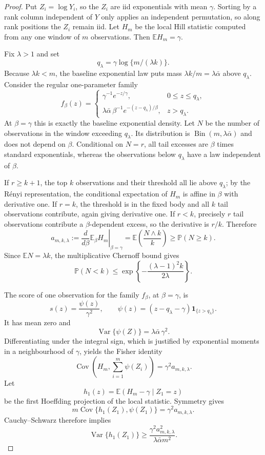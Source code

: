 \begin{proof}
Put $Z_i=\log Y_i$, so the $Z_i$ are iid exponentials with mean $\gamma$.
Sorting by a rank column independent of $Y$ only applies an independent
permutation, so along rank positions the $Z_i$ remain iid. Let $H_m$ be
the local Hill statistic computed from any one window of $m$ observations.
Then $\mathbb EH_m=\gamma$.

Fix $\lambda>1$ and set
\[
 q_\lambda=\gamma\log\{m/(\lambda k)\}.
\]
Because $\lambda k<m$, the baseline exponential law puts mass
$\lambda k/m=\lambda\bar\alpha$ above $q_\lambda$. Consider the regular
one-parameter family
\[
 f_\beta(z)=
 \begin{cases}
  \gamma^{-1}e^{-z/\gamma},&0\le z\le q_\lambda,\\[2mm]
  \lambda\bar\alpha\,\beta^{-1}
  e^{-(z-q_\lambda)/\beta},&z>q_\lambda.
 \end{cases}
\]
At $\beta=\gamma$ this is exactly the baseline exponential density.
Let $N$ be the number of observations in the window exceeding
$q_\lambda$. Its distribution is
$\operatorname{Bin}(m,\lambda\bar\alpha)$ and does not depend on $\beta$.
Conditional on $N=r$, all tail excesses are $\beta$ times standard
exponentials, whereas the observations below $q_\lambda$ have a law
independent of $\beta$.

If $r\ge k+1$, the top $k$ observations and their threshold all lie above
$q_\lambda$; by the R\'enyi representation, the conditional expectation of
$H_m$ is affine in $\beta$ with derivative one. If $r=k$, the threshold is
in the fixed body and all $k$ tail observations contribute, again giving
derivative one. If $r<k$, precisely $r$ tail observations contribute a
$\beta$-dependent excess, so the derivative is $r/k$. Therefore
\[
 a_{m,k,\lambda}
 :=\left.\frac{d}{d\beta}\mathbb E_\beta H_m\right|_{\beta=\gamma}
 =\mathbb E\left(\frac{N\wedge k}{k}\right)
 \ge\mathbb P(N\ge k).
\]
Since $\mathbb EN=\lambda k$, the multiplicative Chernoff bound gives
\[
 \mathbb P(N<k)
 \le\exp\left\{-\frac{(\lambda-1)^2k}{2\lambda}\right\}.
\]

The score of one observation for the family $f_\beta$, at
$\beta=\gamma$, is
\[
 s(z)=\frac{\psi(z)}{\gamma^2},
 \qquad
 \psi(z)=(z-q_\lambda-\gamma)\mathbf 1_{\{z>q_\lambda\}}.
\]
It has mean zero and
\[
 \operatorname{Var}\{\psi(Z)\}
 =\lambda\bar\alpha\,\gamma^2.
\]
Differentiating under the integral sign, which is justified by exponential
moments in a neighbourhood of $\gamma$, yields the Fisher identity
\[
 \operatorname{Cov}\left(H_m,\sum_{i=1}^m\psi(Z_i)\right)
 =\gamma^2a_{m,k,\lambda}.
\]
Let
\[
 h_1(z)=\mathbb E(H_m-\gamma\mid Z_1=z)
\]
be the first Hoeffding projection of the local statistic. Symmetry gives
\[
 m\operatorname{Cov}\{h_1(Z_1),\psi(Z_1)\}
 =\gamma^2a_{m,k,\lambda}.
\]
Cauchy--Schwarz therefore implies
\[
 \operatorname{Var}\{h_1(Z_1)\}
 \ge
 \frac{\gamma^2a_{m,k,\lambda}^2}
      {\lambda\bar\alpha m^2}.
\]


\end{proof}
